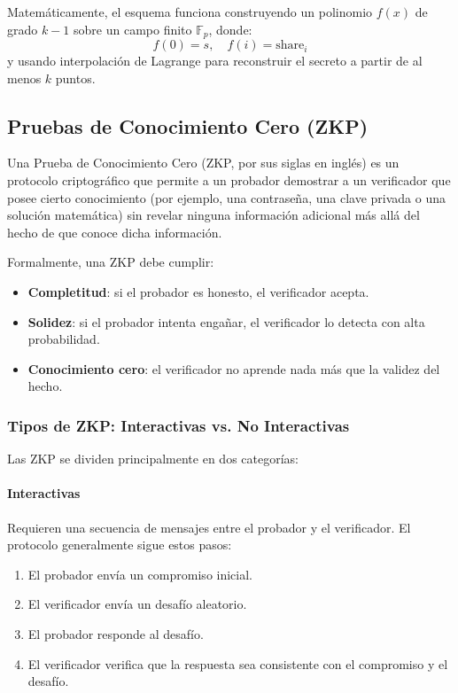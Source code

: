 \documentclass{article}
\begin{document}
Matemáticamente, el esquema funciona construyendo un polinomio \( f(x) \) de grado \( k-1 \) sobre un campo finito \( \mathbb{F}_p \), donde:
\[
f(0) = s, \quad f(i) = \text{share}_i
\]
y usando interpolación de Lagrange para reconstruir el secreto a partir de al menos \( k \) puntos.
\subsection{Pruebas de Conocimiento Cero (ZKP)}

Una Prueba de Conocimiento Cero (ZKP, por sus siglas en inglés) es un protocolo criptográfico que permite a un probador demostrar a un verificador que posee cierto conocimiento (por ejemplo, una contraseña, una clave privada o una solución matemática) sin revelar ninguna información adicional más allá del hecho de que conoce dicha información.

Formalmente, una ZKP debe cumplir:
\begin{itemize}
    \item \textbf{Completitud}: si el probador es honesto, el verificador acepta.
    \item \textbf{Solidez}: si el probador intenta engañar, el verificador lo detecta con alta probabilidad.
    \item \textbf{Conocimiento cero}: el verificador no aprende nada más que la validez del hecho.
\end{itemize}

\subsubsection{Tipos de ZKP: Interactivas vs. No Interactivas}

Las ZKP se dividen principalmente en dos categorías:

\paragraph{Interactivas}

Requieren una secuencia de mensajes entre el probador y el verificador. El protocolo generalmente sigue estos pasos:
\begin{enumerate}
    \item El probador envía un compromiso inicial.
    \item El verificador envía un desafío aleatorio.
    \item El probador responde al desafío.
    \item El verificador verifica que la respuesta sea consistente con el compromiso y el desafío.
\end{enumerate}
\end{document}
